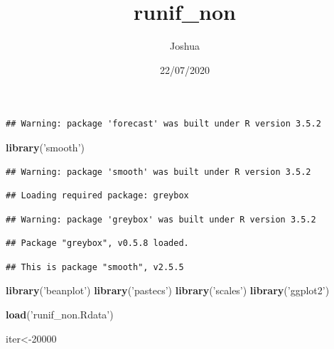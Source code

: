 \documentclass[
]{article}
\title{runif\_non}
\author{Joshua}
\date{22/07/2020}
\newenvironment{Shaded}{\begin{snugshade}}{\end{snugshade}}
\newcommand{\DataTypeTok}[1]{\textcolor[rgb]{0.13,0.29,0.53}{#1}}
\newcommand{\DecValTok}[1]{\textcolor[rgb]{0.00,0.00,0.81}{#1}}
\newcommand{\KeywordTok}[1]{\textcolor[rgb]{0.13,0.29,0.53}{\textbf{#1}}}
\newcommand{\NormalTok}[1]{#1}
\newcommand{\OperatorTok}[1]{\textcolor[rgb]{0.81,0.36,0.00}{\textbf{#1}}}
\newcommand{\OtherTok}[1]{\textcolor[rgb]{0.56,0.35,0.01}{#1}}
\newcommand{\StringTok}[1]{\textcolor[rgb]{0.31,0.60,0.02}{#1}}
\begin{document}
\maketitle

\begin{Shaded}
\end{Shaded}

\begin{verbatim}
## Warning: package 'forecast' was built under R version 3.5.2
\end{verbatim}

\begin{Shaded}
\begin{Highlighting}[]
\KeywordTok{library}\NormalTok{(}\StringTok{'smooth'}\NormalTok{)}
\end{Highlighting}
\end{Shaded}

\begin{verbatim}
## Warning: package 'smooth' was built under R version 3.5.2
\end{verbatim}

\begin{verbatim}
## Loading required package: greybox
\end{verbatim}

\begin{verbatim}
## Warning: package 'greybox' was built under R version 3.5.2
\end{verbatim}

\begin{verbatim}
## Package "greybox", v0.5.8 loaded.
\end{verbatim}

\begin{verbatim}
## This is package "smooth", v2.5.5
\end{verbatim}

\begin{Shaded}
\begin{Highlighting}[]
\KeywordTok{library}\NormalTok{(}\StringTok{'beanplot'}\NormalTok{)}
\KeywordTok{library}\NormalTok{(}\StringTok{'pastecs'}\NormalTok{)}
\KeywordTok{library}\NormalTok{(}\StringTok{'scales'}\NormalTok{)}
\KeywordTok{library}\NormalTok{(}\StringTok{'ggplot2'}\NormalTok{)}

\KeywordTok{load}\NormalTok{(}\StringTok{'runif_non.Rdata'}\NormalTok{)}


\NormalTok{iter<-}\DecValTok{20000}
\end{Highlighting}
\end{Shaded}
\end{document}
